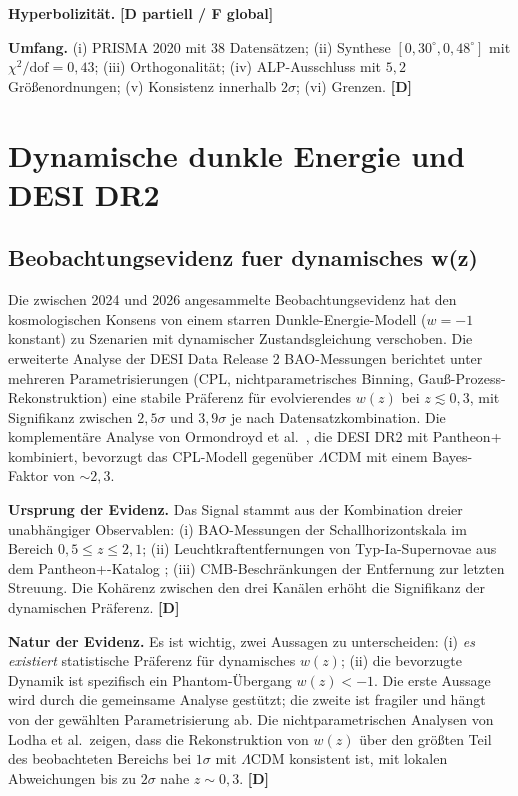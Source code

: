 ﻿\documentclass[11pt,letterpaper]{article}
\begin{document}
\textbf{Hyperbolizität.} \textbf{[D partiell / F global]}

\textbf{Umfang.} (i) PRISMA 2020 mit 38 Datensätzen; (ii) Synthese $[0{,}30^\circ, 0{,}48^\circ]$ mit $\chi^2/\mathrm{dof} = 0{,}43$; (iii) Orthogonalität; (iv) ALP-Ausschluss mit $5{,}2$ Größenordnungen; (v) Konsistenz innerhalb $2\sigma$; (vi) Grenzen. \textbf{[D]}

\section{Dynamische dunkle Energie und DESI DR2}
\subsection{Beobachtungsevidenz fuer dynamisches w(z)}
Die zwischen 2024 und 2026 angesammelte Beobachtungsevidenz hat den kosmologischen Konsens von einem starren Dunkle-Energie-Modell ($w = -1$ konstant) zu Szenarien mit dynamischer Zustandsgleichung verschoben. Die erweiterte Analyse der DESI Data Release 2 BAO-Messungen \cite{Lodha2025} berichtet unter mehreren Parametrisierungen (CPL, nichtparametrisches Binning, Gauß-Prozess-Rekonstruktion) eine stabile Präferenz für evolvierendes $w(z)$ bei $z \lesssim 0{,}3$, mit Signifikanz zwischen $2{,}5\sigma$ und $3{,}9\sigma$ je nach Datensatzkombination. Die komplementäre Analyse von Ormondroyd et al.\ \cite{Ormondroyd2025}, die DESI DR2 mit Pantheon+ kombiniert, bevorzugt das CPL-Modell gegenüber $\Lambda$CDM mit einem Bayes-Faktor von $\sim 2{,}3$.

\textbf{Ursprung der Evidenz.} Das Signal stammt aus der Kombination dreier unabhängiger Observablen: (i) BAO-Messungen der Schallhorizontskala im Bereich $0{,}5 \le z \le 2{,}1$; (ii) Leuchtkraftentfernungen von Typ-Ia-Supernovae aus dem Pantheon+-Katalog \cite{Brout2022}; (iii) CMB-Beschränkungen der Entfernung zur letzten Streuung. Die Kohärenz zwischen den drei Kanälen erhöht die Signifikanz der dynamischen Präferenz. \textbf{[D]}

\textbf{Natur der Evidenz.} Es ist wichtig, zwei Aussagen zu unterscheiden: (i) \emph{es existiert} statistische Präferenz für dynamisches $w(z)$; (ii) die bevorzugte Dynamik ist spezifisch ein Phantom-Übergang $w(z) < -1$. Die erste Aussage wird durch die gemeinsame Analyse gestützt; die zweite ist fragiler und hängt von der gewählten Parametrisierung ab. Die nichtparametrischen Analysen von Lodha et al.\ zeigen, dass die Rekonstruktion von $w(z)$ über den größten Teil des beobachteten Bereichs bei $1\sigma$ mit $\Lambda$CDM konsistent ist, mit lokalen Abweichungen bis zu $2\sigma$ nahe $z \sim 0{,}3$. \textbf{[D]}
\end{document}
